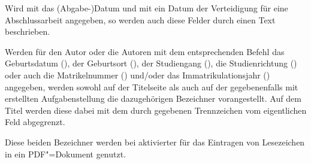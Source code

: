 \begin{Declaration*}{}
\begin{Declaration*}{}
\begin{Declaration*}{}
\begin{Declaration}{}
\begin{Declaration}{}
\printdeclarationlist%
%
%
%
%
%
Wird mit  das (Abgabe-)Datum und mit  ein Datum 
der Verteidigung für eine Abschlussarbeit angegeben, so werden auch diese 
Felder durch einen Text beschrieben.
%
\end{Declaration}
\end{Declaration}

\begin{Declaration}{}
\begin{Declaration}{}
\begin{Declaration}{}
\begin{Declaration}{}
\begin{Declaration}{}
\begin{Declaration}[v2.02]{}
\printdeclarationlist%
%
%
%
Werden für den Autor oder die Autoren mit dem entsprechenden Befehl das 
Geburtsdatum (), der Geburtsort (), der 
Studiengang (), die Studienrichtung () oder 
auch die Matrikelnummer () und/oder das 
Immatrikulationsjahr () angegeben, werden sowohl auf 
der Titelseite als auch auf der gegebenenfalls mit  
erstellten Aufgabenstellung die dazugehörigen Bezeichner vorangestellt. Auf 
dem Titel werden diese dabei mit dem durch  gegebenen 
Trennzeichen vom eigentlichen Feld abgegrenzt.
\end{Declaration}
\end{Declaration}
\end{Declaration}
\end{Declaration}
\end{Declaration}
\end{Declaration}

\begin{Declaration}{}
\begin{Declaration}{}
\printdeclarationlist%
%
%
Diese beiden Bezeichner werden bei aktivierter  für das 
Eintragen von Lesezeichen in ein PDF"=Dokument genutzt.
\end{Declaration}
\end{Declaration}


\end{Declaration*}
\end{Declaration*}
\end{Declaration*}
